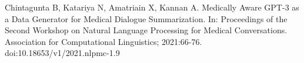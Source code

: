 \begin{CJK*}{UTF8}{bkai}
{\begin{thebibliography}{00}
Chintagunta B, Katariya N, Amatriain X, Kannan A. Medically Aware GPT-3 as a Data Generator for Medical Dialogue Summarization. In: Proceedings of the Second Workshop on Natural Language Processing for Medical Conversations. Association for Computational Linguistics; 2021:66-76. doi:10.18653/v1/2021.nlpmc-1.9
\end{thebibliography}





}
\end{CJK*}
